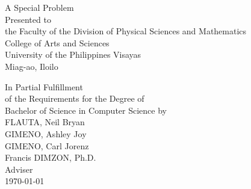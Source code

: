\begin{titlepage}
\centering


\vspace{0.875cm}
A Special Problem\\
Presented to\\
the Faculty of the Division of Physical Sciences and Mathematics\\
College of Arts and Sciences\\
University of the Philippines Visayas\\
Miag-ao, Iloilo

\vspace{0.875cm}
In Partial Fulfillment\\
of the Requirements for the Degree of\\
Bachelor of Science in Computer Science
\vspace{1.75cm}
by\\

\vspace{0.1cm}
FLAUTA, Neil Bryan  \\
GIMENO, Ashley Joy  \\
GIMENO, Carl Jorenz  \\

\vspace{0.875cm}
Francis DIMZON, Ph.D. \\
Adviser\\


\vspace{0.875cm}
\today
\end{titlepage}
